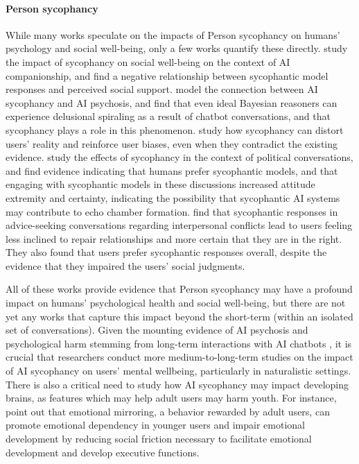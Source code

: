 \paragraph{Person sycophancy}
While many works speculate on the impacts of Person sycophancy on humans' psychology and social well-being, only a few works quantify these directly. \cite{lee2026effects} study the impact of sycophancy on social well-being on the context of AI companionship, and find a negative relationship between sycophantic model responses and perceived social support. \cite{chandra2026sycophantic} model the connection between AI sycophancy and AI psychosis, and find that even ideal Bayesian reasoners can experience delusional spiraling as a result of chatbot conversations, and that sycophancy plays a role in this phenomenon. \cite{Batista2026ARA} study how sycophancy can distort users' reality and reinforce user biases, even when they contradict the existing evidence. \cite{rathje2025sycophantic} study the effects of sycophancy in the context of political conversations, and find evidence indicating that humans prefer sycophantic models, and that engaging with sycophantic models in these discussions increased attitude extremity and certainty, indicating the possibility that sycophantic AI systems may contribute to echo chamber formation. \citet{cheng2026sycophantic} find that sycophantic responses in advice-seeking conversations regarding interpersonal conflicts lead to users feeling less inclined to repair relationships and more certain that they are in the right. They also found that users prefer sycophantic responses overall, despite the evidence that they impaired the users' social judgments. 

All of these works provide evidence that Person sycophancy may have a profound impact on humans' psychological health and social well-being, but there are not yet any works that capture this impact beyond the short-term (within an isolated set of conversations). Given the mounting evidence of AI psychosis and psychological harm stemming from long-term interactions with AI chatbots \cite{TheyAske50:online}, it is crucial that researchers conduct more medium-to-long-term studies on the impact of AI sycophancy on users' mental wellbeing, particularly in naturalistic settings. There is also a critical need to study how AI sycophancy may impact developing brains, as features which may help adult users may harm youth. For instance, \citet{jiao2026ai} point out that emotional mirroring, a behavior rewarded by adult users, can promote emotional dependency in younger users and impair emotional development by reducing social friction necessary to facilitate emotional development and develop executive functions. 


